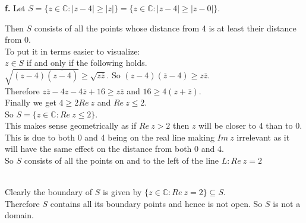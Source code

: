 \documentclass{article}
\begin{document}
\newpage
{\Large\textbf{f.}} Let $S =\{z\in\mathbb{C}: |z - 4|\geq |z|\} =\{z\in\mathbb{C}: |z - 4|\geq |z - 0|\}$.
\begin{center}
    \doublespacing
    Then $S$ consists of all the points whose distance from 4 is at least their distance from 0.
    \\To put it in terms easier to visualize:
    \\$z\in S$ if and only if the following holds. 
    \\$\sqrt{(z - 4)(\overline{z - 4})}\geq \sqrt{z\overline{z}}$. So $(z - 4)(\overline{z} - 4)\geq z\overline{z}$.
    \\Therefore $z\overline{z} - 4z - 4\overline{z} + 16\geq z\overline{z}$ and $16\geq 4(z +\overline{z})$.
    \\Finally we get $4\geq 2 Re\:z$ and $Re\:z\leq 2$.
    \break
    \\So $S =\{z\in\mathbb{C}: Re\:z\leq 2\}$.
    \\This makes sense geometrically as if $Re\:z > 2$ then $z$ will be closer to 4 than to 0. This is due to both 0 and 4 being on the real line making $Im\:z$ irrelevant as it will have the same effect on the distance from both 0 and 4.
    \\So $S$ consists of all the points on and to the left of the line $L: Re\:z = 2$
    \break
    \\Clearly the boundary of $S$ is given by $\{z\in\mathbb{C}: Re\:z = 2\}\subseteq S$.
    \\Therefore $S$ contains all its boundary points and hence is not open. So $S$ is not a domain.
\end{center}


\newpage
\end{document}
